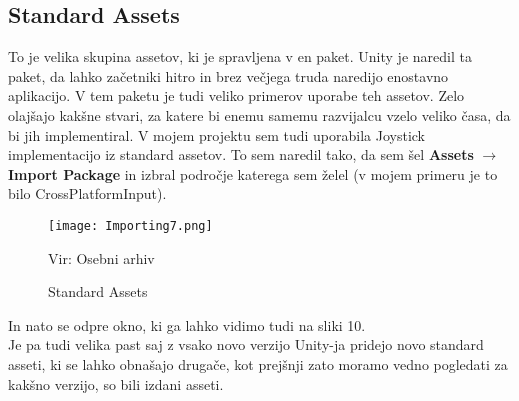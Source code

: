{\color{indiagreen}\subsection{Standard Assets}}
To je velika skupina assetov, ki je spravljena v en paket. Unity je naredil ta paket, da lahko začetniki hitro in brez večjega truda naredijo enostavno aplikacijo. V tem paketu je tudi veliko primerov uporabe teh assetov. Zelo olajšajo kakšne stvari, za katere bi enemu samemu razvijalcu vzelo veliko časa, da bi jih implementiral. V mojem projektu sem tudi uporabila Joystick implementacijo iz standard assetov. To sem naredil tako, da sem šel \textbf{Assets} $\rightarrow$ \textbf{Import Package} in izbral področje katerega sem želel (v mojem primeru je to bilo CrossPlatformInput).\\
\begin{figure}[ht!]
	\centering
	\texttt{[image: Importing7.png]}
	\caption{Standard Assets}
	{\tiny Vir: Osebni arhiv}
\end{figure}
In nato se odpre okno, ki ga lahko vidimo tudi na sliki 10.\\
Je pa tudi velika past saj z vsako novo verzijo Unity-ja pridejo novo standard asseti, ki se lahko obnašajo drugače, kot prejšnji zato moramo vedno pogledati za kakšno verzijo, so bili izdani asseti.